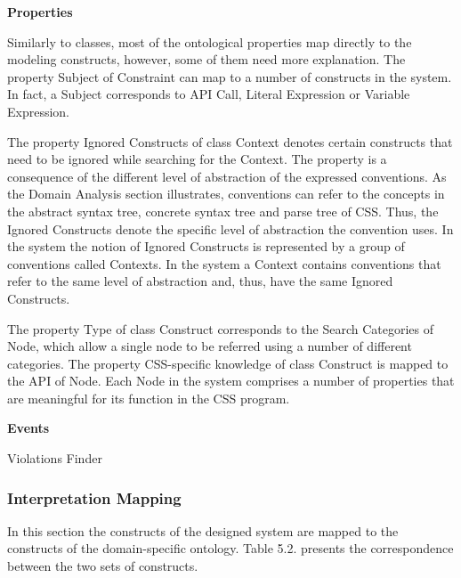 \documentclass[parskip=full]{uvamscse}
\begin{document}
\textbf{Properties}

Similarly to classes, most of the ontological properties map directly to the modeling constructs,
however, some of them need more explanation. The property Subject of Constraint can map to a number
of constructs in the system. In fact, a Subject corresponds to API Call, Literal Expression or
Variable Expression.

The property Ignored Constructs of class Context denotes certain constructs that need to be ignored
while searching for the Context. The property is a consequence of the different level of abstraction
of the expressed conventions. As the Domain Analysis section illustrates, conventions can refer to
the concepts in the abstract syntax tree, concrete syntax tree and parse tree of CSS. Thus, the
Ignored Constructs denote the specific level of abstraction the convention uses. In the system the
notion of Ignored Constructs is represented by a group of conventions called Contexts. In the system
a Context contains conventions that refer to the same level of abstraction and, thus, have the same
Ignored Constructs.

The property Type of class Construct corresponds to the Search Categories of Node, which allow a
single node to be referred using a number of different categories. The property CSS-specific
knowledge of class Construct is mapped to the API of Node. Each Node in the system comprises a
number of properties that are meaningful for its function in the CSS program.

\textbf{Events}

Violations Finder


\subsubsection{Interpretation Mapping}

In this section the constructs of the designed system are mapped to the constructs of the
domain-specific ontology. Table 5.2. presents the correspondence between the two sets of constructs.
\end{document}
